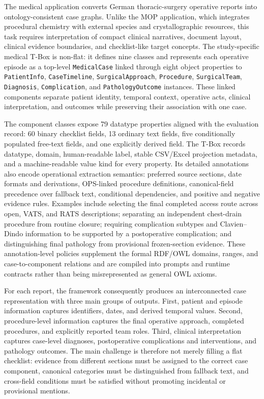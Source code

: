 The medical application converts German thoracic-surgery operative reports into ontology-consistent case graphs. Unlike the MOP application, which integrates procedural chemistry with external species and crystallographic resources, this task requires interpretation of compact clinical narratives, document layout, clinical evidence boundaries, and checklist-like target concepts. The study-specific medical T-Box is non-flat: it defines nine classes and represents each operative episode as a top-level \texttt{MedicalCase} linked through eight object properties to \texttt{PatientInfo}, \texttt{CaseTimeline}, \texttt{SurgicalApproach}, \texttt{Procedure}, \texttt{SurgicalTeam}, \texttt{Diagnosis}, \texttt{Complication}, and \texttt{PathologyOutcome} instances. These linked components separate patient identity, temporal context, operative acts, clinical interpretation, and outcomes while preserving their association with one case.

The component classes expose 79 datatype properties aligned with the evaluation record: 60 binary checklist fields, 13 ordinary text fields, five conditionally populated free-text fields, and one explicitly derived field. The T-Box records datatype, domain, human-readable label, stable CSV/Excel projection metadata, and a machine-readable value kind for every property. Its detailed annotations also encode operational extraction semantics: preferred source sections, date formats and derivations, OPS-linked procedure definitions, canonical-field precedence over fallback text, conditional dependencies, and positive and negative evidence rules. Examples include selecting the final completed access route across open, VATS, and RATS descriptions; separating an independent chest-drain procedure from routine closure; requiring complication subtypes and Clavien--Dindo information to be supported by a postoperative complication; and distinguishing final pathology from provisional frozen-section evidence. These annotation-level policies supplement the formal RDF/OWL domains, ranges, and case-to-component relations and are compiled into prompts and runtime contracts rather than being misrepresented as general OWL axioms.

For each report, the framework consequently produces an interconnected case representation with three main groups of outputs. First, patient and episode information captures identifiers, dates, and derived temporal values. Second, procedure-level information captures the final operative approach, completed procedures, and explicitly reported team roles. Third, clinical interpretation captures case-level diagnoses, postoperative complications and interventions, and pathology outcomes. The main challenge is therefore not merely filling a flat checklist: evidence from different sections must be assigned to the correct case component, canonical categories must be distinguished from fallback text, and cross-field conditions must be satisfied without promoting incidental or provisional mentions.

